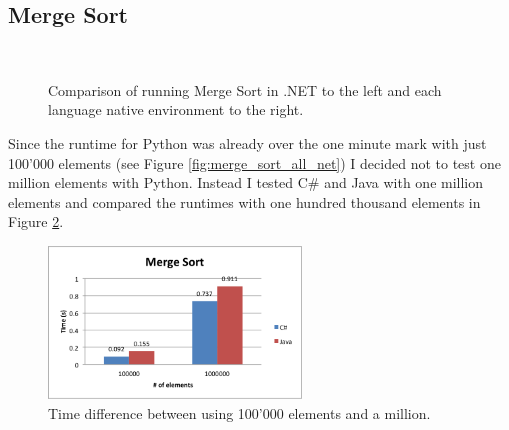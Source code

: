 \subsection{Merge Sort}

\begin{figure}[h]
	\centering
	\mbox{
	}
	\caption{Comparison of running Merge Sort in .NET to the left and each language native environment to the right.}
	\label{fig:merge_sort_net_native}
\end{figure}


Since the runtime for Python was already over the one minute mark with just 100'000 elements (see Figure \ref{fig:merge_sort_all_net}) I decided not to test one million elements with Python. Instead I tested C\# and Java with one million elements and compared the runtimes with one hundred thousand elements in Figure \ref{fig:merge_sort_csharp_java}.

\begin{figure}[h]
	\centering
	\includegraphics[width=0.6\textwidth]{chapters/media/merge_sort_csharp_java.png}
	\caption{Time difference between using 100'000 elements and a million.}
	\label{fig:merge_sort_csharp_java}
\end{figure}

